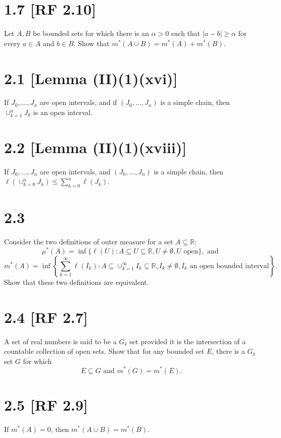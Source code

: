 \documentclass[12pt]{article}
\begin{document}
\section*{1.7 [RF 2.10]} 
Let $A,B$ be bounded sets for which there is an $\alpha > 0$
such that $|a-b| \geq \alpha$ for every $a\in A$ and $b \in B$. Show that
$m^{*}(A\cup B) = m^{*}(A) + m^{*}(B)$.



\section*{2.1 [Lemma (II)(1)(xvi)]} 
If $J_{0}, \dots, J_{n}$ are open intervals, and
if $(J_{0}, \dots, J_{n})$ is a simple chain, then $\cup_{k=1}^{n}J_{k}$ is an
open interval.


\section*{2.2 [Lemma (II)(1)(xviii)]} 
If $J_{0}, \dots, J_{n}$ are open intervals, and $(J_{0}, \hdots, J_{n})$ is a simple chain, then $\ell(\cup_{k=0}^{n}J_{k}) \leq \sum_{k=0}^{n}\ell(J_{k})$.


\section*{2.3} 
Consider the two definitions of outer measure for a set $A \subseteq
\mathbb{R}$:
\[ \mu^{*}(A) = \inf\{\ell(U) : A \subseteq U \subseteq \mathbb{R}, U \neq
\emptyset, U \text{ open}\}, \text{ and } \]
\[ m^{*}(A) = \inf\left\{\sum_{k=1}^{\infty}\ell(I_{k}) : A \subseteq
\cup_{k=1}^{\infty}I_{k} \subseteq \mathbb{R}, I_{k} \neq \emptyset, I_{k}
\text{ an open bounded interval}\right\}. \]
Show that these two definitions are equivalent.


\section*{2.4 [RF 2.7]} A set of real numbers is said to be a $G_{\delta}$ set
provided it is the intersection of a countable collection of open sets. Show
that for any bounded set $E$, there is a $G_{\delta}$ set $G$ for which 
\[ E \subseteq G \text{ and } m^{*}(G) = m^{*}(E). \]


\section*{2.5 [RF 2.9]} 
If $m^{*}(A) = 0$, then $m^{*}(A\cup B) = m^{*}(B)$.
\end{document}
